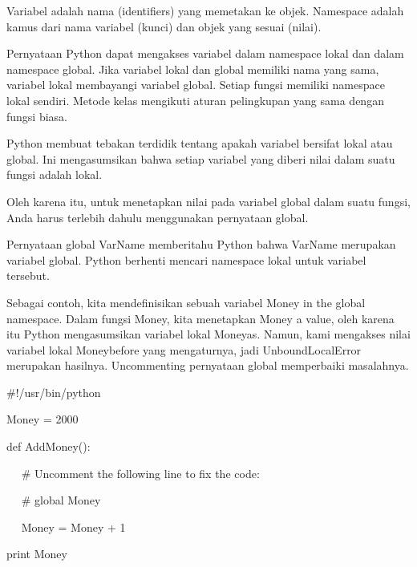 \noindent 
Variabel adalah nama (identifiers) yang memetakan ke objek. Namespace adalah kamus dari nama variabel (kunci) dan objek yang sesuai (nilai). \par
\noindent 
Pernyataan Python dapat mengakses variabel dalam namespace lokal dan dalam namespace global. Jika variabel lokal dan global memiliki nama yang sama, variabel lokal membayangi variabel global. Setiap fungsi memiliki namespace lokal sendiri. Metode kelas mengikuti aturan pelingkupan yang sama dengan fungsi biasa. \par
\noindent 
Python membuat tebakan terdidik tentang apakah variabel bersifat lokal atau global. Ini mengasumsikan bahwa setiap variabel yang diberi nilai dalam suatu fungsi adalah lokal. \par
\noindent 
Oleh karena itu, untuk menetapkan nilai pada variabel global dalam suatu fungsi, Anda harus terlebih dahulu menggunakan pernyataan global. \par
\noindent 
Pernyataan global VarName memberitahu Python bahwa VarName merupakan variabel global. Python berhenti mencari namespace lokal untuk variabel tersebut. \par
\noindent 
Sebagai contoh, kita mendefinisikan sebuah variabel Money in the global namespace. Dalam fungsi Money, kita menetapkan Money a value, oleh karena itu Python mengasumsikan variabel lokal Moneyas. Namun, kami mengakses nilai variabel lokal Moneybefore yang mengaturnya, jadi UnboundLocalError merupakan hasilnya. Uncommenting pernyataan global memperbaiki masalahnya. \par
\noindent 
 \hspace*{0.5in}  $  \#  $!/usr/bin/python \par
\vspace{12pt}
\noindent 
 \hspace*{0.5in} Money = 2000 \par
\noindent 
 \hspace*{0.5in} def AddMoney(): \par
\noindent 
 \hspace*{0.5in} ~~  $  \#  $ Uncomment the following line to fix the code: \par
\noindent 
 \hspace*{0.5in} ~~  $  \#  $ global Money \par
\noindent 
 \hspace*{0.5in} ~~ Money = Money + 1 \par
\vspace{12pt}
\noindent 
 \hspace*{0.5in} print Money \par
